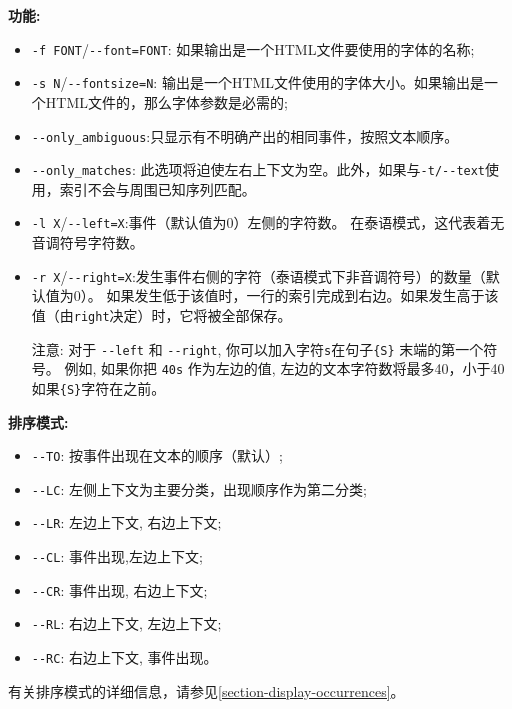 \bigskip
\noindent \textbf{功能:}
\begin{itemize}
  \item \verb+-f FONT+/\verb+--font=FONT+: 如果输出是一个HTML文件要使用的字体的名称;
  \item \verb+-s N+/\verb+--fontsize=N+: 输出是一个HTML文件使用的字体大小。如果输出是一个HTML文件的，那么字体参数是必需的;
  \item \verb+--only_ambiguous+:只显示有不明确产出的相同事件，按照文本顺序。 
  \item \verb+--only_matches+: 
此选项将迫使左右上下文为空。此外，如果与\verb+-t/--text+使用，索引不会与周围已知序列匹配。
  \item \verb+-l X+/\verb+--left=X+:事件（默认值为0）左侧的字符数。
在泰语模式，这代表着无音调符号字符数。 
  \item \verb+-r X+/\verb+--right=X+:发生事件右侧的字符（泰语模式下非音调符号）的数量（默认值为0）。
如果发生低于该值时，一行的索引完成到右边。如果发生高于该值（由\verb+right+决定）时，它将被全部保存。
 
  
  \bigskip
  注意: 对于 \verb+--left+ 和 \verb+--right+, 你可以加入字符\verb+s+在句子\verb+{S}+
  末端的第一个符号。
   例如, 如果你把 
  \verb+40s+ 作为左边的值, 左边的文本字符数将最多40，小于40如果\verb+{S}+字符在之前。
\end{itemize}

\bigskip
\noindent \textbf{排序模式:}
\begin{itemize}
  \item \verb+--TO+: 按事件出现在文本的顺序（默认）;
  \item \verb+--LC+: 左侧上下文为主要分类，出现顺序作为第二分类;
  \item \verb+--LR+: 左边上下文, 右边上下文;
  \item \verb+--CL+: 事件出现,左边上下文;
  \item \verb+--CR+: 事件出现, 右边上下文;
  \item \verb+--RL+: 右边上下文, 左边上下文;
  \item \verb+--RC+: 右边上下文, 事件出现。
\end{itemize}
\noindent 
有关排序模式的详细信息，请参见\ref{section-display-occurrences}。

